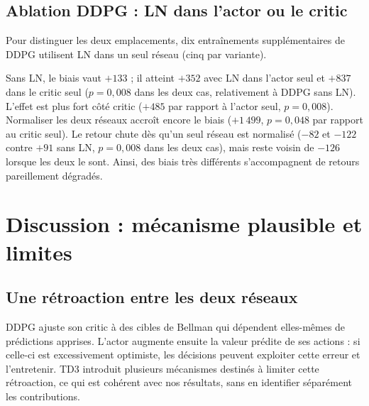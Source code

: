 \documentclass[10pt,a4paper]{article}
\begin{document}
\setlength{\parskip}{1.0pt}
\titlespacing*{\subsection}{0pt}{3.5pt}{1pt}
\subsection{Ablation DDPG : LN dans l'actor ou le critic}
Pour distinguer les deux emplacements, dix entraînements supplémentaires de DDPG utilisent LN dans un seul réseau (cinq par variante).
\begin{table}[H]
\centering\footnotesize

\caption{DDPG : moyenne $\pm$ écart-type sur cinq graines, mêmes checkpoints finaux que le tableau~\ref{tab:resultats}.}
\end{table}
\vspace{-5pt}
Sans LN, le biais vaut $+133$ ; il atteint $+352$ avec LN dans l'actor seul et $+837$ dans le critic seul ($p=0{,}008$ dans les deux cas, relativement à DDPG sans LN). L'effet est plus fort côté critic ($+485$ par rapport à l'actor seul, $p=0{,}008$). Normaliser les deux réseaux accroît encore le biais ($+1\,499$, $p=0{,}048$ par rapport au critic seul). Le retour chute dès qu'un seul réseau est normalisé ($-82$ et $-122$ contre $+91$ sans LN, $p=0{,}008$ dans les deux cas), mais reste voisin de $-126$ lorsque les deux le sont. Ainsi, des biais très différents s'accompagnent de retours pareillement dégradés.

\begingroup
{}
\setlength{\parskip}{1.0pt}
\titlespacing*{\subsection}{0pt}{3.5pt}{1pt}
\section{Discussion : mécanisme plausible et limites}
\subsection{Une rétroaction entre les deux réseaux}
DDPG ajuste son critic à des cibles de Bellman qui dépendent elles-mêmes de prédictions apprises. L'actor augmente ensuite la valeur prédite de ses actions : si celle-ci est excessivement optimiste, les décisions peuvent exploiter cette erreur et l'entretenir. TD3 introduit plusieurs mécanismes destinés à limiter cette rétroaction, ce qui est cohérent avec nos résultats, sans en identifier séparément les contributions.
\end{document}

